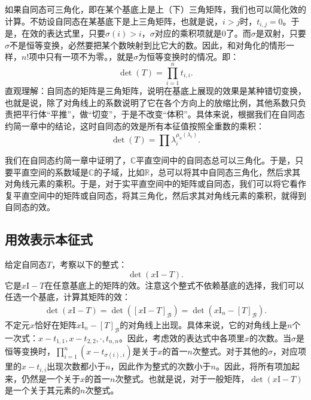 \documentclass[12pt,UTF8,fontset=none]{ctexbook}
\begin{document}
如果自同态可三角化，即在某个基底上是上（下）三角矩阵，我们也可以简化效的计算。不妨设自同态在某基底下是上三角矩阵，也就是说，$i>j$时，$t_{i,j} = 0$。于是，在效的表达式里，只要$\sigma(i) > i$，$\sigma$对应的乘积项就是$0$了。而$\sigma$是双射，只要$\sigma$不是恒等变换，必然要把某个数映射到比它大的数。因此，和对角化的情形一样，$n!$项中只有一项不为零。，就是$\sigma$为恒等变换时的情况。即：
$$
\det(T) = \prod_{i=1}^n t_{i,i}.
$$
直观理解：自同态的矩阵是三角矩阵，说明在基底上展现的效果是某种错切变换，也就是说，除了对角线上的系数说明了它在各个方向上的放缩比例，其他系数只负责把平行体“平推”，做“切变”，于是不改变“体积”。具体来说，根据我们在自同态约简一章中的结论，这时自同态的效是所有本征值按照全重数的乘积：
$$
\det(T) = \prod\lambda_i^{\mu_a(\lambda_i)}.
$$

我们在自同态约简一章中证明了，$\mathbb{C}$平直空间中的自同态总可以三角化。于是，只要平直空间的系数域是$\mathbb{C}$的子域，比如$\mathbf{\mathbb{R}}$，总可以将其中自同态三角化，然后求其对角线元素的乘积。于是，对于实平直空间中的矩阵或自同态，我们可以将它看作复平直空间中的矩阵或自同态，将其三角化，然后求其对角线元素的乘积，就得到自同态的效。

\subsection{用效表示本征式}
给定自同态$T$，考察以下的整式：
$$
\det(x \mathrm{I} - T).
$$
它是$x \mathrm{I} - T$在任意基底上的矩阵的效。注意这个整式不依赖基底的选择，我们可以任选一个基底，计算其矩阵的效：
\begin{align*}
    \det(x \mathrm{I} - T) = \det([x \mathrm{I} - T]_{\mathcal{B}}) = \det(x\mathrm{I}_n - [T]_{\mathcal{B}}).
\end{align*}
不定元$x$恰好在矩阵$x\mathrm{I}_n - [T]_{\mathcal{B}}$的对角线上出现。具体来说，它的对角线上是$n$个一次式：$x - t_{1,1}, x - t_{2,2}, \cdot, t_{n, n}$。因此，考虑效的表达式中各项里$x$的次数。当$\sigma$是恒等变换时，$\prod_{i=1}^n (x - t_{\sigma(i),i})$是关于$x$的首一$n$次整式。对于其他的$\sigma$，对应项里的$x - t_{i,i}$出现次数都小于$n$，因此作为整式的次数小于$n$。因此，将所有项加起来，仍然是一个关于$x$的首一$n$次整式。也就是说，对于一般矩阵，$\det(x \mathrm{I} - T)$是一个关于其元素的$n$次整式。
\end{document}
